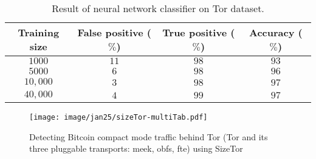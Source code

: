 \begin{table}
\center \caption{Result of neural network classifier on Tor dataset.}\label{tab:nn_tor}
\begin{tabular}{|c|c|c|c|}
\hline
 Training size& False positive ($\%$) &True positive ($\%$)&Accuracy ($\%$)\\
      \hline
	$1000$&$11$ &$98 $  & $93$\\
	$5000$&$6$& $98$  & $96$\\
	$10,000$&$3$& $98$  &$ 97$\\
	$40,000$&$4$& $99$   & $97$\\
\hline
\end{tabular}
\end{table}


\begin{figure}
\centering
\texttt{[image: image/jan25/sizeTor-multiTab.pdf]}%
\caption{Detecting Bitcoin compact mode traffic behind Tor (Tor and its three pluggable transports: meek, obfs, fte) using SizeTor}
\label{fig:tor_sizeTor}
\end{figure}


\iffalse
\subsection{Bitcoin over VPN}
Another countermeasure that we evaluate is passing our traffic through VPN. Since VPN encrypts the traffic and 
\subsubsection{Evaluating Bitcoin over VPN}


\begin{figure*}[!t]
\begin{subfigure}{.48\linewidth}
\centering
\texttt{[image: image/jan25/vpn\_d2u.pdf]}
\caption{Result of \code{D2U} classifier according to traffic length and think time}
\label{fig:tp}
\end{subfigure}
\centering
\begin{subfigure}{.48\linewidth}
\texttt{[image: image/jan25/roc\_vpn\_d2u.pdf]}
\caption{ROC curve for Think Time $=2$ minutes}
\label{fig:fp}
\end{subfigure}
\caption{Result of \code{D2U} classifier on \bc Traffic Tunneled over VPN}
\label{fig:vpn}
\end{figure*}
\fi





